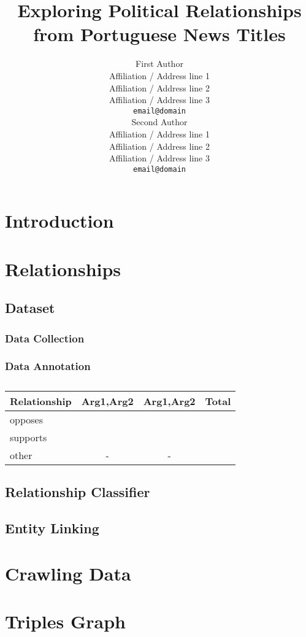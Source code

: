 \documentclass[11pt,a4paper]{article}
\title{Exploring Political Relationships from Portuguese News Titles}
\author{First Author \\
  Affiliation / Address line 1 \\
  Affiliation / Address line 2 \\
  Affiliation / Address line 3 \\
  \texttt{email@domain} \\\And
  Second Author \\
  Affiliation / Address line 1 \\
  Affiliation / Address line 2 \\
  Affiliation / Address line 3 \\
  \texttt{email@domain} \\}
\date{}
\begin{document}
\maketitle
\begin{abstract}

\end{abstract}


\section{Introduction}
\label{sec:intro}


\section{Relationships}
\label{sec:rel}






\subsection{Dataset}
\label{subsec:rel_data}

\subsubsection{Data Collection}
\label{subsubsec:rel_data_collec}


\subsubsection{Data Annotation}
\label{subsubsec:rel_data_annot}


\begin{table}[!h]
\centering
\begin{tabular}{lccr}
\hline \textbf{Relationship} & \textbf{Arg1,Arg2} & \textbf{Arg1,Arg2} & \textbf{Total} \\ \hline
opposes        &  &  \\
supports       &  &  \\
other          & - & - & \\
\hline
\end{tabular}
\caption{\label{font-table}  }
\end{table}

\subsection{Relationship Classifier}
\label{subsec:rel_classifier}


\subsection{Entity Linking}
\label{subsec:ent_linking}


\section{Crawling Data}
\label{sec:crawl}


\section{Triples Graph}
\label{sec:triples_graph}

%
%
\end{document}
